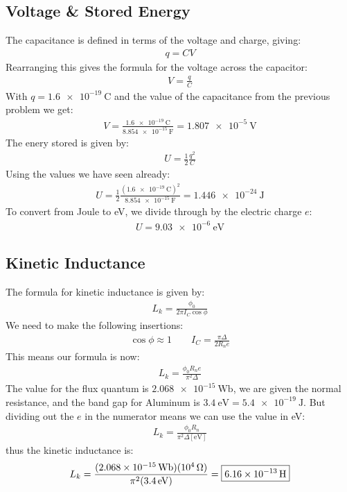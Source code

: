 \documentclass[12pt]{article}
\begin{document}
\subsection{Voltage \& Stored Energy}
The capacitance is defined in terms of the voltage and charge, giving:
\begin{align*}
  q=CV
\end{align*}
Rearranging this gives the formula for the voltage across the capacitor:
\begin{align*}
  V=\frac{q}{C}
\end{align*}
With $q=\SI{1.6e-19}{\coulomb}$ and the value of the capacitance from the previous problem we get:
\begin{align*}
  V=\frac{\SI{1.6e-19}{\coulomb}}{\SI{8.854e-15}{\F}}=\boxed{\SI{1.807e-5}{\V}}
\end{align*}
The enery stored is given by:
\begin{align*}
  U=\frac{1}{2}\frac{q^2}{C}
\end{align*}
Using the values we have seen already:
\begin{align*}
  U=\frac{1}{2}\frac{(\SI{1.6e-19}{\coulomb})^2}{\SI{8.854e-15}{\F}}
  =\SI{1.446e-24}{\J}
\end{align*}
To convert from Joule to eV, we divide through by the electric charge $e$:
\begin{align*}
  \boxed{U=\SI{9.03e-6}{\eV}}
\end{align*}
\subsection{Kinetic Inductance}
The formula for kinetic inductance is given by:
\begin{align*}
  L_k=\frac{\phi_0}{2\pi I_C\cos\phi}
\end{align*}
We need to make the following insertions:
\begin{align*}
  \cos\phi\approx 1\qquad I_C=\frac{\pi\Delta}{2R_ne}
\end{align*}
This means our formula is now:
\begin{align*}
  L_k=\frac{\phi_0R_ne}{\pi^2\Delta}
\end{align*}
The value for the flux quantum is $\SI{2.068e-15}{\weber}$, we are given the normal resistance, and the band gap for Aluminum is $\SI{3.4}{\eV}=\SI{5.4e-19}{\J}$. But dividing out the $e$ in the numerator means we can use the value in eV:
\begin{align*}
  L_k=\frac{\phi_0R_n}{\pi^2\Delta[\si{\eV}]}
\end{align*}
thus the kinetic inductance is:
\begin{align*}
  L_k=\frac{(\SI{2.068e-15}{\weber})(\SI{e4}{\ohm})}{
  \pi^2(\SI{3.4}{\eV})}=\boxed{\SI{6.16e-13}{\H}}
\end{align*}
\end{document}
